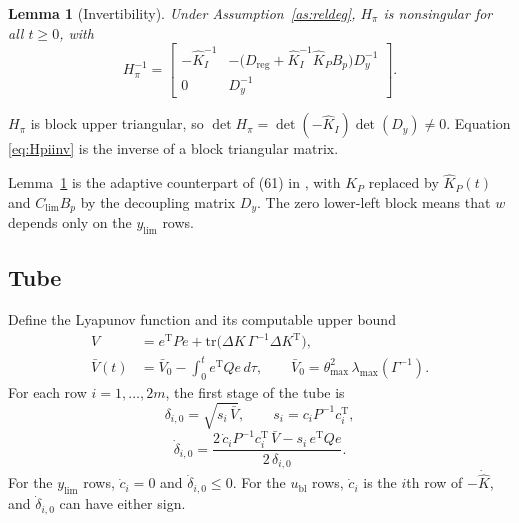 \documentclass[lettersize,journal]{IEEEtran}
\newtheorem{lemma}{Lemma}
\newcommand{\Kh}{\hat{K}}
\newcommand{\Khd}{\dot{\hat{K}}}
\newcommand{\ub}{u_{\mathrm{bl}}}
\newcommand{\Clim}{C_{\mathrm{lim}}}
\newcommand{\ylim}{y_{\mathrm{lim}}}
\newcommand{\Dreg}{D_{\mathrm{reg}}}
\newcommand{\Vb}{\bar{V}}
\newcommand{\tmax}{\theta_{\max}}
\newcommand{\T}{\mathrm{T}}
\begin{document}
\begin{lemma}[Invertibility] \label{lem:inv}
Under Assumption~\ref{as:reldeg}, $H_\pi$ is nonsingular for all $t\ge0$, with
\begin{equation}
H_\pi^{-1}=\begin{bmatrix}-\Kh_I^{-1} & -\big(\Dreg+\Kh_I^{-1}\Kh_P B_p\big)D_y^{-1}\\ 0 & D_y^{-1}\end{bmatrix}. \label{eq:Hpiinv}
\end{equation}
\end{lemma}
\begin{IEEEproof}
$H_\pi$ is block upper triangular, so $\det H_\pi=\det(-\Kh_I)\det(D_y)\neq0$. Equation \eqref{eq:Hpiinv} is the inverse of a block triangular matrix.
\end{IEEEproof}

Lemma~\ref{lem:inv} is the adaptive counterpart of (61) in \cite{lavretsky2025}, with $K_P$ replaced by $\Kh_P(t)$ and $\Clim B_p$ by the decoupling matrix $D_y$. The zero lower-left block means that $w$ depends only on the $\ylim$ rows.

\subsection{Tube} \label{sec:tube}

Define the Lyapunov function and its computable upper bound
\begin{align}
V &= e^\T P e + \mathrm{tr}\big(\Delta K\,\Gamma^{-1}\Delta K^\T\big), \label{eq:V}\\
\Vb(t) &= \Vb_0 - \int_0^t e^\T Q e\,d\tau, \qquad \Vb_0=\tmax^2\,\lambda_{\max}(\Gamma^{-1}). \label{eq:Vbar}
\end{align}
For each row $i=1,\dots,2m$, the first stage of the tube is
\begin{equation}
\delta_{i,0} = \sqrt{s_i\,\Vb},\qquad s_i = c_i P^{-1} c_i^\T, \label{eq:delta}
\end{equation}
\begin{equation}
\dot\delta_{i,0} = \frac{2\,\dot c_i P^{-1}c_i^\T\,\Vb - s_i\,e^\T Q e}{2\,\delta_{i,0}}. \label{eq:deltadot}
\end{equation}
For the $\ylim$ rows, $\dot c_i=0$ and $\dot\delta_{i,0}\le0$. For the $\ub$ rows, $\dot c_i$ is the $i$th row of $-\Khd$, and $\dot\delta_{i,0}$ can have either sign.
\end{document}

